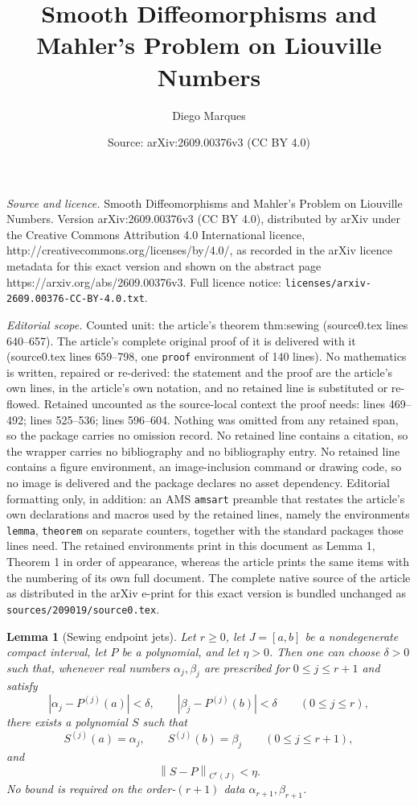 \documentclass[10pt,a4paper]{amsart}
\title{Smooth Diffeomorphisms and Mahler's Problem on Liouville Numbers}
\author{Diego Marques}
\date{Source: arXiv:2609.00376v3 (CC BY 4.0)}
\newtheorem{lemma}{Lemma}
\newcommand{\norm}[1]{\left\lVert #1\right\rVert}
\begin{document}
\maketitle

\noindent\emph{Source and licence.} Smooth Diffeomorphisms and Mahler's Problem on Liouville Numbers. Version arXiv:2609.00376v3 (CC BY 4.0), distributed by arXiv under the Creative Commons Attribution 4.0 International licence, http://creativecommons.org/licenses/by/4.0/, as recorded in the arXiv licence metadata for this exact version and shown on the abstract page https://arxiv.org/abs/2609.00376v3. Full licence notice: \texttt{licenses/arxiv-2609.00376-CC-BY-4.0.txt}.\par\smallskip

\noindent\textit{Editorial scope.} Counted unit: the article's theorem thm:sewing (source0.tex lines 640--657). The article's complete original proof of it is delivered with it (source0.tex lines 659--798, one \texttt{proof} environment of 140 lines). No mathematics is written, repaired or re-derived: the statement and the proof are the article's own lines, in the article's own notation, and no retained line is substituted or re-flowed.  Retained uncounted as the source-local context the proof needs: lines 469--492; lines 525--536; lines 596--604.  Nothing was omitted from any retained span, so the package carries no omission record.  No retained line contains a citation, so the wrapper carries no bibliography and no bibliography entry.  No retained line contains a figure environment, an image-inclusion command or drawing code, so no image is delivered and the package declares no asset dependency.  Editorial formatting only, in addition: an AMS \texttt{amsart} preamble that restates the article's own declarations and macros used by the retained lines, namely the environments \texttt{lemma}, \texttt{theorem} on separate counters, together with the standard packages those lines need.  The retained environments print in this document as Lemma 1, Theorem 1 in order of appearance, whereas the article prints the same items with the numbering of its own full document.  The complete native source of the article as distributed in the arXiv e-print for this exact version is bundled unchanged as \texttt{sources/209019/source0.tex}.
\begin{lemma}[Sewing endpoint jets]\label{lem:stitch}
Let $r\geq0$, let $J=[a,b]$ be a nondegenerate compact interval, let $P$ be a polynomial,
and let $\eta>0$. Then one can choose $\delta>0$ such that, whenever real
numbers $\alpha_j,\beta_j$ are prescribed for $0\leq j\leq r+1$ and satisfy
\[
|\alpha_j-P^{(j)}(a)|<\delta,
\qquad
|\beta_j-P^{(j)}(b)|<\delta
\qquad(0\leq j\leq r),
\]
there exists a polynomial $S$ such that
\[
S^{(j)}(a)=\alpha_j,
\qquad
S^{(j)}(b)=\beta_j
\qquad(0\leq j\leq r+1),
\]
and
\[
\norm{S-P}_{C^r(J)}<\eta.
\]
No bound is required on the order-$(r+1)$ data
$\alpha_{r+1},\beta_{r+1}$.
\end{lemma}
\end{document}
